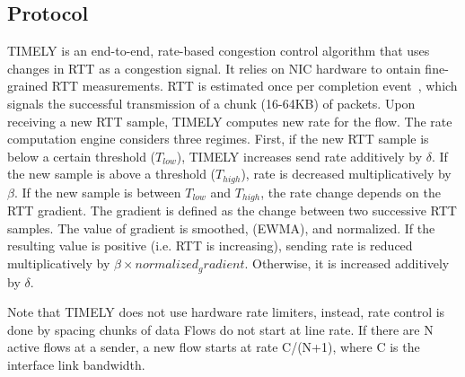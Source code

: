 \subsection{Protocol}

TIMELY is an end-to-end, rate-based congestion control algorithm that uses
changes in RTT as a congestion signal.  It relies on NIC hardware to ontain
fine-grained RTT measurements. RTT is estimated once per completion
event~\cite{rocev2}, which signals the successful transmission of a chunk
(16-64KB) of packets. Upon receiving a new RTT sample, TIMELY computes new rate
for the flow.   The rate computation engine considers three regimes. First, if
the new RTT sample is below a certain threshold ($T_{low}$), TIMELY increases
send rate additively by $\delta$. If the new sample is above a threshold
($T_{high}$), rate is decreased multiplicatively by $\beta$. If the new sample
is between $T_{low}$ and $T_{high}$, the rate change depends on the RTT
gradient.  The gradient is defined as the change between two successive RTT
samples. The value of gradient is smoothed, (EWMA), and normalized. If the
resulting value is positive (i.e. RTT is increasing), sending rate is reduced
multiplicatively by $\beta \times normalized_gradient$.  Otherwise, it is
increased additively by $\delta$.

Note that TIMELY does not use hardware rate limiters, instead, rate control is
done by spacing chunks of data Flows do not start at line rate. If there are N
active flows at a sender, a new flow starts at rate C/(N+1), where C is the
interface link bandwidth.



